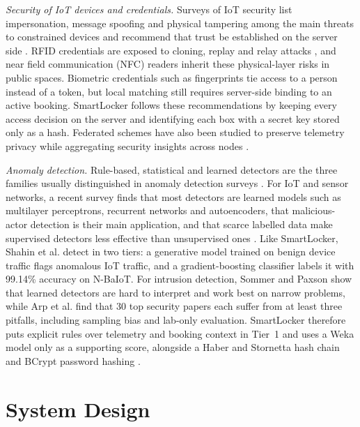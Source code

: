 \documentclass[journal,onecolumn]{IEEEtran}
\begin{document}
\textit{Security of IoT devices and credentials.} Surveys of IoT security list impersonation, message spoofing and
physical tampering among the main threats to constrained devices \cite{roman2013features} and recommend that trust be
established on the server side \cite{sicari2015security}. RFID credentials are exposed to cloning, replay and relay
attacks \cite{mitrokotsa2010rfid}, and near field communication (NFC) readers inherit these physical-layer risks in
public spaces. Biometric credentials such as fingerprints tie access to a person instead of a token, but local matching
still requires server-side binding to an active booking. SmartLocker follows these recommendations by keeping every
access decision on the server and identifying each box with a secret key stored only as a hash. Federated schemes have
also been studied to preserve telemetry privacy while aggregating security insights across nodes \cite{shahin2025twostage}.

\textit{Anomaly detection.} Rule-based, statistical and learned detectors are the three families usually distinguished
in anomaly detection surveys \cite{chandola2009anomaly}. For IoT and sensor networks, a recent survey finds that most
detectors are learned models such as multilayer perceptrons, recurrent networks and autoencoders, that malicious-actor
detection is their main application, and that scarce labelled data make supervised detectors less effective than
unsupervised ones \cite{demedeiros2023anomaly}. Like SmartLocker, Shahin et al. \cite{shahin2025twostage} detect in two
tiers: a generative model trained on benign device traffic flags anomalous IoT traffic, and a gradient-boosting
classifier labels it with 99.14\% accuracy on N-BaIoT. For intrusion detection, Sommer and Paxson
\cite{sommer2010outside} show that learned detectors are hard to interpret and work best on narrow problems, while Arp
et al. \cite{arp2024pitfalls} find that 30 top security papers each suffer from at least three pitfalls, including
sampling bias and lab-only evaluation. SmartLocker therefore puts explicit rules over telemetry and booking context in
Tier~1 and uses a Weka model \cite{hall2009weka} only as a supporting score, alongside a Haber and Stornetta hash chain
\cite{haber1991timestamp} and BCrypt password hashing \cite{provos1999bcrypt}.

\section{System Design}
\end{document}
